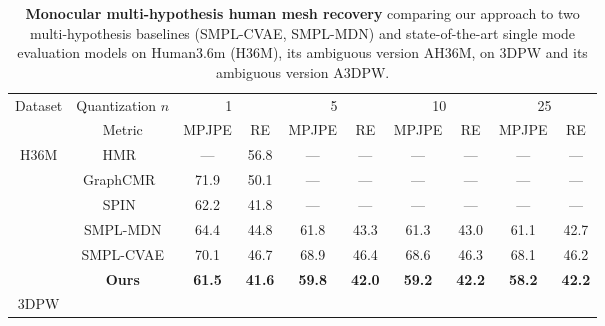 \newcommand{\rottext}[1]{\centering\rotatebox{90}{#1}}
\newcommand{\rotmpage}[1]{
\begin{minipage}[c][2cm][c]{0.1cm}%
\rottext{#1}%
\end{minipage}%
}
\newcommand{\wcolone}{1.2cm}
\newcommand{\td}{TD}

\begin{table}[t]
\caption{%
\textbf{Monocular multi-hypothesis human mesh recovery} comparing our approach to
two multi-hypothesis baselines (SMPL-CVAE, SMPL-MDN) and
state-of-the-art single mode evaluation models \cite{kolotouros19learning,kolotouros19convolutional,kanazawa18end-to-end}
on Human3.6m (H36M), its ambiguous version AH36M, on 3DPW and its ambiguous version A3DPW.
}\label{tab:tab_quantitative}%
\vspace{0.2cm}
\centering \footnotesize
\begin{tabular}{c|c|cccccccc}
\toprule
\multirow{2}{\wcolone}{Dataset}      &
\multicolumn{1}{c}{Quantization $n$} & 
\multicolumn{2}{c}{1} & 
\multicolumn{2}{c}{5} & 
\multicolumn{2}{c}{10} & 
\multicolumn{2}{c}{25} \\ \cmidrule{2-10} 
& \multicolumn{1}{c}{Metric}
& MPJPE     & RE        
& MPJPE     & RE
& MPJPE      & RE        
& MPJPE      & RE        \\
\midrule
\multirow{6}{\wcolone}{H36M}
& HMR~\cite{kanazawa18end-to-end}
& ---      & 56.8      
& ---       & ---       
& ---        & ---       
& ---        & ---       \\
& GraphCMR~\cite{kolotouros19convolutional}
& 71.9      & 50.1      
& ---       & ---       
& ---        & ---       
& ---        & ---       \\
& SPIN~\cite{kolotouros19learning}
& 62.2      & 41.8
& ---       & ---       
& ---        & ---       
& ---        & ---       \\
& SMPL-MDN                
& 64.4  & 44.8 
& 61.8  & 43.3       
& 61.3  & 43.0
& 61.1  & 42.7      \\
& SMPL-CVAE                
& 70.1  & 46.7      
& 68.9  & 46.4      
& 68.6  & 46.3      
& 68.1  & 46.2      \\
& \textbf{Ours}
& \textbf{61.5} & \textbf{41.6}
& \textbf{59.8} & \textbf{42.0}
& \textbf{59.2} & \textbf{42.2}
& \textbf{58.2} & \textbf{42.2}
\\
\midrule
\multirow{6}{\wcolone}{3DPW}

\end{tabular}
\end{table}

